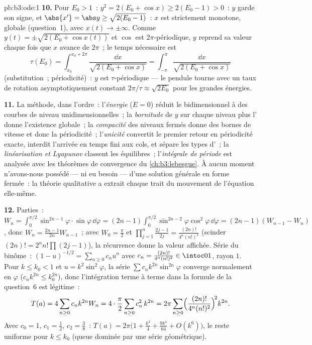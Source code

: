 \begin{solution}{pb:b3:ode:1}
\textbf{10.} Pour $E_0 > 1$~: $y^2 = 2(E_0 + \cos x) \geq
2(E_0 - 1) > 0$~: $y$ garde son signe, et $\abs{x'} = \abs y
\geq \sqrt{2(E_0 - 1)}$~: $x$ est strictement monotone,
globale (question~1), avec $x(t) \to \pm\infty$. Comme $y(t)
= \pm\sqrt{2(E_0 + \cos x(t))}$ et $\cos$ est
$2\pi$-périodique, $y$ reprend sa valeur chaque fois que $x$
avance de $2\pi$~; le temps nécessaire est
\[
\tau(E_0) = \int_{x_0}^{x_0 + 2\pi}\frac{\dd
x}{\sqrt{2(E_0 + \cos x)}} =
\int_{-\pi}^{\pi}\frac{\dd x}{\sqrt{2(E_0 + \cos x)}}
\]
(substitution~; périodicité)~: $y$ est $\tau$-périodique ---
le pendule tourne avec un taux de rotation asymptotiquement
constant $2\pi/\tau \approx \sqrt{2E_0}$ pour les grandes
énergies.

\textbf{11.} La méthode, dans l'ordre~: l'\emph{énergie}
($\dot E = 0$) réduit le  bidimensionnel à des courbes
de niveau unidimensionnelles~; la \emph{bornitude} de $y$
sur chaque niveau plus l' donne
l'existence globale~; la \emph{compacité} des niveaux fermés
donne des bornes de vitesse et donc la périodicité~;
l'\emph{unicité} convertit le premier retour en périodicité
exacte, interdit l'arrivée en temps fini aux cols, et sépare
les types d'~; la \emph{linéarisation et Lyapunov}
classent les équilibres~; l'\emph{intégrale de période} est
analysée avec les théorèmes de convergence du
\cref{ch:b3:lebesgue}. À aucun moment n'avons-nous possédé
--- ni eu besoin --- d'une solution générale en forme
fermée~: la théorie qualitative a extrait chaque trait du
mouvement de l'équation elle-même.

\textbf{12.} Parties~: $W_n = \int_0^{\pi/2}\sin^{2n-1}\varphi
\cdot\sin\varphi\,\dd\varphi = (2n-1)\int_0^{\pi/2}
\sin^{2n-2}\varphi\cos^2\varphi\,\dd\varphi = (2n-1)(W_{n-1}
- W_n)$, donc $W_n = \frac{2n-1}{2n}W_{n-1}$~; avec $W_0 =
\frac\pi2$ et $\prod_{j=1}^n\frac{2j-1}{2j} =
\frac{(2n)!}{4^n(n!)^2}$ (scinder $(2n)! =
2^nn!\prod(2j-1)$), la récurrence donne la valeur affichée.
Série du binôme~: $(1 - u)^{-1/2} = \sum_{n\geq0}c_nu^n$ avec
$c_n = \frac{(2n)!}{4^n(n!)^2} \in \intoc01$, rayon $1$. Pour
$k \leq k_0 < 1$ et $u = k^2\sin^2\varphi$, la série
$\sum c_nk^{2n}\sin^{2n}\varphi$ converge normalement en
$\varphi$ ($c_nk^{2n} \leq k_0^{2n}$), donc l'intégration
terme à terme dans la formule de la question~6 est
légitime~:
\[
T(a) = 4\sum_{n\geq0}c_nk^{2n}W_n
= 4\cdot\frac\pi2\sum_{n\geq0}c_n^2\,k^{2n}
= 2\pi\sum_{n\geq0}
\Bigl(\frac{(2n)!}{4^n(n!)^2}\Bigr)^{\!2}k^{2n} .
\]
Avec $c_0 = 1$, $c_1 = \frac12$, $c_2 = \frac38$~: $T(a) =
2\pi\bigl(1 + \frac{k^2}4 + \frac{9k^4}{64} + O(k^6)\bigr)$,
le reste uniforme pour $k \leq k_0$ (queue dominée par une
série géométrique).


\end{solution}
